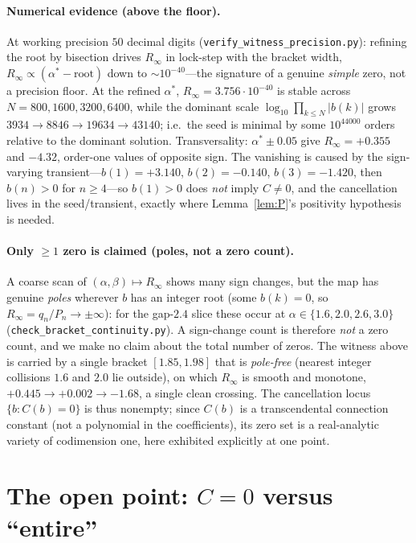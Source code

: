 \documentclass[11pt]{article}
\newcommand{\Rinf}{R_\infty}
\begin{document}
\paragraph{Numerical evidence (above the floor).}
At working precision $50$ decimal digits (\texttt{verify\_witness\_precision.py}):
refining the root by bisection drives $\Rinf$ in lock-step with the bracket width,
$\Rinf\propto(\alpha^\ast-\text{root})$ down to $\sim10^{-40}$---the signature of a
genuine \emph{simple} zero, not a precision floor. At the refined $\alpha^\ast$,
$\Rinf=3.756\cdot10^{-40}$ is stable across $N=800,1600,3200,6400$, while the
dominant scale $\log_{10}\prod_{k\le N}|b(k)|$ grows $3934\to8846\to19634\to43140$;
i.e.\ the seed is minimal by some $10^{44000}$ orders relative to the dominant
solution. Transversality: $\alpha^\ast\pm0.05$ give $\Rinf=+0.355$ and $-4.32$,
order-one values of opposite sign. The vanishing is caused by the sign-varying
transient---$b(1)=+3.140$, $b(2)=-0.140$, $b(3)=-1.420$, then $b(n)>0$ for
$n\ge4$---so $b(1)>0$ does \emph{not} imply $C\neq0$, and the cancellation lives in
the seed/transient, exactly where Lemma~\ref{lem:P}'s positivity hypothesis is
needed.

\paragraph{Only $\ge1$ zero is claimed (poles, not a zero count).}
A coarse scan of $(\alpha,\beta)\mapsto\Rinf$ shows many sign changes, but the map
has genuine \emph{poles} wherever $b$ has an integer root (some $b(k)=0$, so
$\Rinf=q_n/P_n\to\pm\infty$): for the gap-$2.4$ slice these occur at
$\alpha\in\{1.6,2.0,2.6,3.0\}$ (\texttt{check\_bracket\_continuity.py}). A
sign-change count is therefore \emph{not} a zero count, and we make no claim about
the total number of zeros. The witness above is carried by a single bracket
$[1.85,1.98]$ that is \emph{pole-free} (nearest integer collisions $1.6$ and $2.0$
lie outside), on which $\Rinf$ is smooth and monotone, $+0.445\to+0.002\to-1.68$, a
single clean crossing. The cancellation locus $\{b:C(b)=0\}$ is thus nonempty;
since $C(b)$ is a transcendental connection constant (not a polynomial in the
coefficients), its zero set is a real-analytic variety of codimension one, here
exhibited explicitly at one point.

\section{The open point: $C=0$ versus ``entire''}\label{sec:step0}
\end{document}
